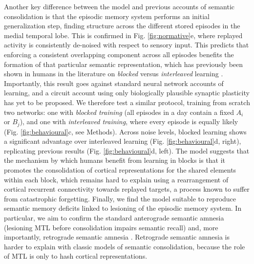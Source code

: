 \documentclass{article}
\begin{document}
Another key difference between the model and previous accounts of semantic consolidation is that the episodic memory system performs an initial generalization step, finding structure across the different stored episodes in the medial temporal lobe. This is confirmed in Fig. \ref{fig:normative}e, where replayed activity is consistently de-noised with respect to sensory input. This predicts that enforcing a consistent overlapping component across all episodes benefits the formation of that particular semantic representation, which has previously been shown in humans in the literature on \textit{blocked} versus \textit{interleaved} learning . Importantly, this result goes against standard neural network accounts of learning, and a circuit account using only biologically plausible synaptic plasticity has yet to be proposed. We therefore test a similar protocol, training from scratch two networks: one with \textit{blocked training} (all episodes in a day contain a fixed $A_i$ or $B_j$), and one with \textit{interleaved training}, where every episode is equally likely (Fig. \ref{fig:behavioural}c, see Methods). Across noise levels, blocked learning shows a significant advantage over interleaved learning (Fig. \ref{fig:behavioural}d, right), replicating previous results (Fig. \ref{fig:behavioural}d, left). The model suggests that the mechanism by which humans benefit from learning in blocks is that it promotes the consolidation of cortical representations for the shared elements within each block, which remains hard to explain using a rearrangement of cortical recurrent connectivity towards replayed targets, a process known to suffer from catastrophic forgetting.
\newline\newline
Finally, we find the model suitable to reproduce semantic memory deficits linked to lesioning of the episodic memory system. In particular, we aim to confirm the standard anterograde semantic amnesia (lesioning MTL before consolidation impairs semantic recall) and, more importantly, retrograde  semantic amnesia . Retrograde semantic amnesia is harder to explain with classic models of semantic consolidation, because the role of MTL is only to hash cortical representations.
\newline\newline
\end{document}
